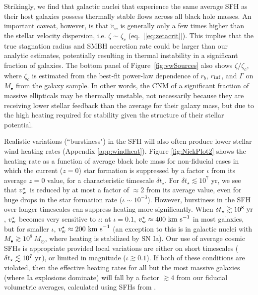 \documentclass[usenatbib,fleqn]{mn2e}
\newcommand{\vw}{\tilde{v}_{w}}
\newcommand{\rinf}{r_{\rm inf}}
\begin{document}
Strikingly, we find that galactic nuclei that experience the same
average SFH as their host galaxies possess thermally stable flows
across all black hole masses.  An important caveat, however, is that
$\vw$ is generally only a few times higher than the stellar velocity
dispersion, i.e. $\zeta \sim \zeta_c$ (eq.~[\ref{eq:zetacrit}]).  This
implies that the true stagnation radius and SMBH accretion rate could
be larger than our analytic estimates, potentially resulting in
thermal instability in a significant fraction of galaxies.  The bottom
panel of Figure~\ref{fig:vwSources} also shows $\zeta/\zeta_c$, where
$\zeta_c$ is estimated from the best-fit power-law dependence of
$r_b$, $\rinf$, and $\Gamma$ on $M_{\bullet}$ from the
\citet{LauerFaber+:2007a} galaxy sample.  In other words, the CNM of a
significant fraction of massive ellipticals may be thermally unstable,
not necessarily because they are receiving lower stellar feedback than
the average for their galaxy mass, but due to the high heating
required for stability given the structure of their stellar potential.

Realistic variations (``burstiness") in the SFH
will also often produce lower stellar wind heating rates (Appendix
\ref{app:windheat}).  Figure \ref{fig:NickPlot2} shows the heating
rate as a function of average black hole mass for non-fiducial cases
in which the current ($z = 0$) star formation is suppressed by a
factor $\iota$ from its average $z = 0$ value, for a characteristic
timescale $\delta t_{\star}$.  For $\delta t_{\star} \lesssim 10^{7}$
yr, we see that $v_{\rm w}^{\star}$ is reduced by at most a factor of
$\approx 2$ from its average value, even for huge drops in the star
formation rate ($\iota \sim 10^{-3}$).  However, burstiness in the
SFH over longer timescales can suppress heating
more significantly.  When $\delta t_{\star} \gtrsim 10^8~{\rm yr}$,
$v_{\rm w}^\star$ becomes very sensitive to $\iota$: at $\iota=0.1$,
$v_{\rm w}^\star \approx 400~{\rm km~s}^{-1}$ in most galaxies, but
for smaller $\iota$, $v_{\rm w}^\star \approx 200~{\rm km~s}^{-1}$ (an
exception to this is in galactic nuclei with $M_\bullet \gtrsim
10^8~M_\odot$, where heating is stabilized by SN Ia).  Our use
of average cosmic SFHs is appropriate provided
local variations are either on short timescales ($\delta t_{\star}
\lesssim 10^7~{\rm yr}$), or limited in magnitude ($\iota \gtrsim
0.1$).  If both of these conditions are violated, then the effective
heating rates for all but the most massive galaxies (where Ia
explosions dominate) will fall by a factor $\gtrsim 4$ from our
fiducial volumetric averages, calculated using SFHs from \citet{MosterNaab+:2013a}.
\end{document}
